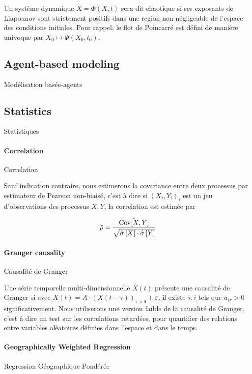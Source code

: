 Un système dynamique $\dot{X}=\Phi(X,t)$ sera dit chaotique si ses exposants de Liapounov sont strictement positifs dans une region non-négligeable de l'espace des conditions initiales. Pour rappel, le flot de Poincarré est défini de manière univoque par $X_0 \mapsto \Phi(X_0,t_0)$.


\subsection*{Agent-based modeling}{Modélisation basée-agents}





\subsection*{Statistics}{Statistiques}


\paragraph{Correlation}{Correlation}

Sauf indication contraire, nous estimerons la covariance entre deux processus par estimateur de Pearson non-biaisé, c'est à dire si $(X_i,Y_i)_i$ est un jeu d'observations des processus $X,Y$, la correlation est estimée par

\[
\hat{\rho} = \frac{\hat{\operatorname{Cov}\!\left[X,Y\right]}}{\sqrt{\hat{\sigma} \left[X\right] \cdot \hat{\sigma}\left[Y\right]}}
\]




\paragraph{Granger causality}{Causalité de Granger}


Une série temporelle multi-dimensionnelle $X(t)$ présente une causalité de Granger si avec $X(t) = A\cdot \left(X(t-\tau)\right)_{\tau >0} + \varepsilon$, il existe $\tau,i$ tels que $a_{i\tau}>0$ significativement. Nous utiliserons une version faible de la causalité de Granger, c'est à dire un test sur les correlations retardées, pour quantifier des relations entre variables aléatoires définies dans l'espace et dans le temps.




\paragraph{Geographically Weighted Regression}{Regression Géographique Pondérée}


